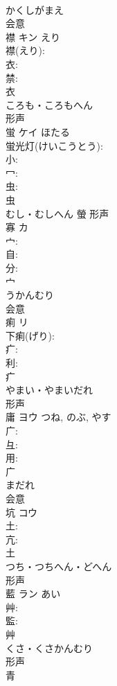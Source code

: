 \documentclass[8pt]{extreport}
\begin{document}
\begin{CJK}{UTF8}{min}
\\	かくしがまえ	
\\	会意 
\\	襟	キン	えり		
\\	襟(えり): 
\\	衣: 
\\	禁: 
\\	衣	
\\	ころも・ころもへん	
\\	形声 
\\	蛍	ケイ	ほたる		
\\	蛍光灯(けいこうとう): 
\\	小: 
\\	冖: 
\\	虫: 
\\	虫	
\\	むし・むしへん	螢	形声 
\\	寡	カ			
\\	宀: 
\\	自: 
\\	分: 
\\	宀	
\\	うかんむり	
\\	会意 
\\	痢	リ			
\\	下痢(げり): 
\\	疒: 
\\	利: 
\\	疒	
\\	やまい・やまいだれ	
\\	形声 
\\	庸	ヨウ		つね, のぶ, やす	
\\	广: 
\\	彑: 
\\	用: 
\\	广	
\\	まだれ	
\\	会意 
\\	坑	コウ			
\\	土: 
\\	亢: 
\\	土	
\\	つち・つちへん・どへん	
\\	形声 
\\	藍	ラン	あい		
\\	艸: 
\\	監: 
\\	艸	
\\	くさ・くさかんむり	
\\	形声 
\\	青 

\end{CJK}
\end{document}
